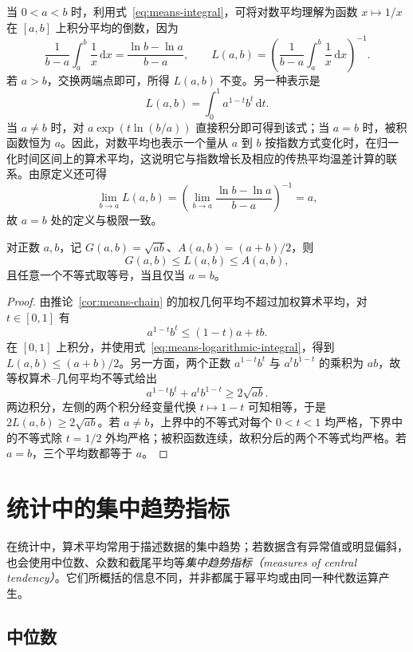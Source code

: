 \documentclass[UTF8,12pt,a4paper,fontset=fandol]{ctexart}
\begin{document}
当 $0<a<b$ 时，利用式~\eqref{eq:means-integral}，可将对数平均理解为函数 $x\mapsto1/x$ 在 $[a,b]$ 上积分平均的倒数，因为
\[
  \frac{1}{b-a}\int_a^b\frac{1}{x}\,\mathrm dx
  =\frac{\ln b-\ln a}{b-a},
  \qquad
  L(a,b)=\left(\frac{1}{b-a}\int_a^b\frac{1}{x}\,\mathrm dx\right)^{-1}.
\]
若 $a>b$，交换两端点即可，所得 $L(a,b)$ 不变。另一种表示是
\begin{equation}
\label{eq:means-logarithmic-integral}
  L(a,b)=\int_0^1 a^{1-t}b^t\,\mathrm dt.
\end{equation}
当 $a\ne b$ 时，对 $a\exp(t\ln(b/a))$ 直接积分即可得到该式；当 $a=b$ 时，被积函数恒为 $a$。因此，对数平均也表示一个量从 $a$ 到 $b$ 按指数方式变化时，在归一化时间区间上的算术平均，这说明它与指数增长及相应的传热平均温差计算的联系。由原定义还可得
\[
  \lim_{b\to a}L(a,b)
  =\left(\lim_{b\to a}\frac{\ln b-\ln a}{b-a}\right)^{-1}=a,
\]
故 $a=b$ 处的定义与极限一致。

\begin{proposition}
对正数 $a,b$，记 $G(a,b)=\sqrt{ab}$、$A(a,b)=(a+b)/2$，则
\[
  G(a,b)\le L(a,b)\le A(a,b),
\]
且任意一个不等式取等号，当且仅当 $a=b$。
\end{proposition}

\begin{proof}
由推论~\ref{cor:means-chain} 的加权几何平均不超过加权算术平均，对 $t\in[0,1]$ 有
\[
  a^{1-t}b^t\le(1-t)a+tb.
\]
在 $[0,1]$ 上积分，并使用式~\eqref{eq:means-logarithmic-integral}，得到 $L(a,b)\le(a+b)/2$。另一方面，两个正数 $a^{1-t}b^t$ 与 $a^tb^{1-t}$ 的乘积为 $ab$，故等权算术--几何平均不等式给出
\[
  a^{1-t}b^t+a^tb^{1-t}\ge2\sqrt{ab}.
\]
两边积分，左侧的两个积分经变量代换 $t\mapsto1-t$ 可知相等，于是 $2L(a,b)\ge2\sqrt{ab}$。若 $a\ne b$，上界中的不等式对每个 $0<t<1$ 均严格，下界中的不等式除 $t=1/2$ 外均严格；被积函数连续，故积分后的两个不等式均严格。若 $a=b$，三个平均数都等于 $a$。
\end{proof}

\section{统计中的集中趋势指标}
\label{sec:means-statistical-location}

在统计中，算术平均常用于描述数据的集中趋势；若数据含有异常值或明显偏斜，也会使用中位数、众数和截尾平均等\emph{集中趋势指标（measures of central tendency）}。它们所概括的信息不同，并非都属于幂平均或由同一种代数运算产生。

\subsection{中位数}
\end{document}
